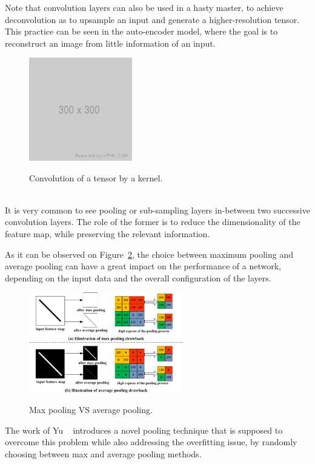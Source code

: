 Note that convolution layers can also be used in a hasty master, to achieve
deconvolution as to upsample an input and generate a higher-resolution tensor.
This practice can be seen in the auto-encoder model, where the goal is to
reconstruct an image from little information of an input.

\begin{figure}[h]
	\center
	\includegraphics[width=0.4\textwidth]{figure/300x300.png}
	\label{fig:convolution}
	\caption{Convolution of a tensor by a kernel.}
\end{figure}


~\\It is very common to see pooling or sub-sampling layers in-between two
successive convolution layers. The role of the former is to reduce the
dimensionality of the feature map, while preserving the relevant information.

As it can be observed on Figure~\ref{fig:pooling}, the choice between maximum
pooling and average pooling can have a great impact on the performance of a
network, depending on the input data and the overall configuration of the
layers. 

\begin{figure}[h]
	\center
	\includegraphics[width=0.6\textwidth]{figure/max_vs_avrg_pooling.png}
	\label{fig:pooling}
	\caption{Max pooling VS average pooling.}
\end{figure}

The work of Yu \etal~\cite{MixedPooling} introduces a novel pooling
technique that is supposed to overcome this problem while also addressing the
overfitting issue, by randomly choosing between max and average pooling
methods.\\

